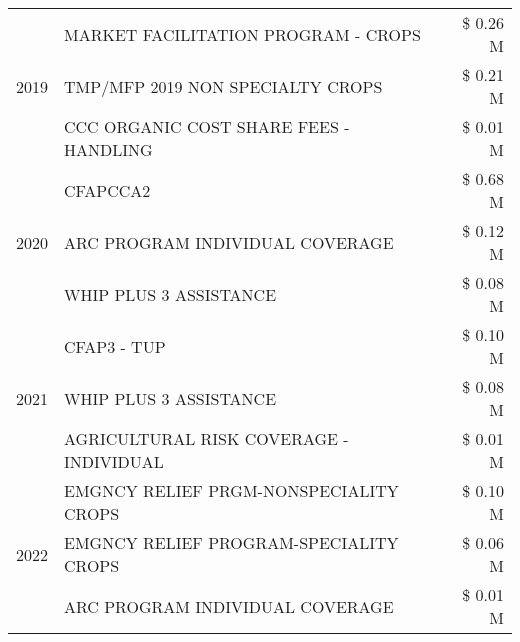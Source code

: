 \begin{tabular}{llr}
\multirow[t]{3}{*}{2019} & MARKET FACILITATION PROGRAM - CROPS & \$ 0.26 M \\
 & TMP/MFP 2019 NON SPECIALTY CROPS & \$ 0.21 M \\
 & CCC ORGANIC COST SHARE FEES - HANDLING & \$ 0.01 M \\
\cline{1-3}
\multirow[t]{3}{*}{2020} & CFAPCCA2 & \$ 0.68 M \\
 & ARC PROGRAM INDIVIDUAL COVERAGE & \$ 0.12 M \\
 & WHIP PLUS 3 ASSISTANCE & \$ 0.08 M \\
\cline{1-3}
\multirow[t]{3}{*}{2021} & CFAP3 - TUP & \$ 0.10 M \\
 & WHIP PLUS 3 ASSISTANCE & \$ 0.08 M \\
 & AGRICULTURAL RISK COVERAGE - INDIVIDUAL & \$ 0.01 M \\
\cline{1-3}
\multirow[t]{3}{*}{2022} & EMGNCY RELIEF PRGM-NONSPECIALITY CROPS & \$ 0.10 M \\
 & EMGNCY RELIEF PROGRAM-SPECIALITY CROPS & \$ 0.06 M \\
 & ARC PROGRAM INDIVIDUAL COVERAGE & \$ 0.01 M \\
\cline{1-3}
\bottomrule
\end{tabular}
